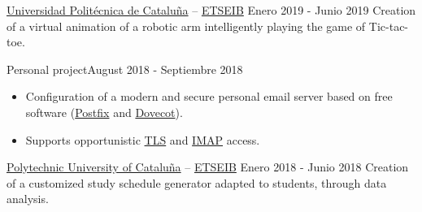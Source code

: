 \documentclass[10pt, a4paper, ragged2e]{altacv}
\begin{document}
\divider

{\href{https://upc.edu}{Universidad Politécnica de Cataluña} --
\href{https://etseib.upc.edu}{ETSEIB}}
{Enero 2019 - Junio 2019}{}
Creation of a virtual animation of a robotic arm intelligently playing the game
of Tic-tac-toe.

\divider

{Personal project}{August 2018 - Septiembre 2018}{}
\begin{itemize}
  \item Configuration of a modern and secure personal email server based on
  free software (\href{http://www.postfix.org/}{Postfix} and
  \href{https://www.dovecot.org/}{Dovecot}).
  \item Supports opportunistic
  \href{https://en.wikipedia.org/wiki/Transport_Layer_Security}{TLS} and
  \href{https://en.wikipedia.org/wiki/Internet_Message_Access_Protocol}
  {IMAP} access.
\end{itemize}

\divider

{\href{https://upc.edu}{Polytechnic University of Cataluña} --
\href{https://etseib.upc.edu}{ETSEIB}}
{Enero 2018 - Junio 2018}{}
Creation of a customized study schedule generator adapted to students, through
data analysis.


\medskip


\end{document}
